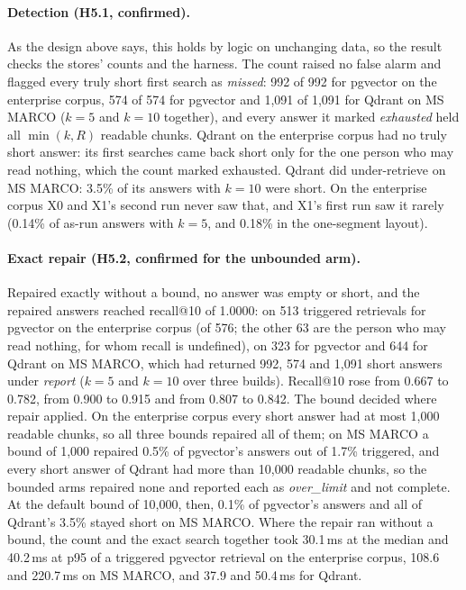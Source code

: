 \paragraph{Detection (H5.1, confirmed).}
As the design above says, this holds by logic on unchanging data, so the result checks the stores' counts and the harness. The count raised no false alarm and flagged every truly short first search as \emph{missed}: 992 of
992 for pgvector on the enterprise corpus, 574 of 574 for pgvector and 1,091 of 1,091 for Qdrant on MS
MARCO ($k = 5$ and $k = 10$ together), and every answer it marked \emph{exhausted} held all $\min(k,
R)$ readable chunks. Qdrant on the enterprise corpus had no truly short answer: its first searches came
back short only for the one person who may read nothing, which the count marked exhausted.
Qdrant did under-retrieve on MS MARCO: 3.5\% of its
answers with $k = 10$ were short. On the enterprise corpus X0 and X1's second run never saw that, and X1's first run saw it rarely (0.14\% of as-run answers with $k = 5$, and 0.18\% in the one-segment layout).

\paragraph{Exact repair (H5.2, confirmed for the unbounded arm).}
Repaired exactly without a bound, no answer was empty or short, and the repaired answers reached
recall@10 of 1.0000: on 513 triggered retrievals for pgvector on the enterprise corpus (of 576; the other 63 are the person who may read nothing, for whom recall is undefined), on 323 for
pgvector and 644 for Qdrant on MS MARCO, which had returned 992, 574 and 1,091 short answers under
\emph{report} ($k = 5$ and $k = 10$ over three builds). Recall@10 rose from 0.667 to 0.782, from 0.900 to 0.915 and from 0.807 to 0.842. The
bound decided where repair applied. On the enterprise corpus every short answer had at most 1,000
readable chunks, so all three bounds repaired all of them; on MS MARCO a bound of 1,000 repaired 0.5\%
of pgvector's answers out of 1.7\% triggered, and every short answer of Qdrant had more than 10,000
readable chunks, so the bounded arms repaired none and reported each as \emph{over\_limit} and not
complete. At the default bound of 10,000, then, 0.1\% of pgvector's answers and all of Qdrant's 3.5\%
stayed short on MS MARCO. Where the repair ran without a bound, the count and the exact search
together took 30.1\,ms at the median
and 40.2\,ms at p95 of a triggered pgvector retrieval on the enterprise corpus, 108.6 and 220.7\,ms on
MS MARCO, and 37.9 and 50.4\,ms for Qdrant.

